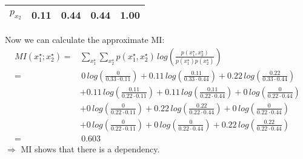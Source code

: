 {\begin{enumerate}[a)]
\begin{table}[H]
\begin{tabular}{r|rrr|r}
  		\hline 
  		$p_{x_2}$& 0.11 & 0.44 & 0.44 & 1.00 \\ 
  		\hline
  	\end{tabular}
  \end{table}
Now we can calculate the approximate MI: 
   \begin{align*}
   	MI(x_1^\star ; x_2^\star) = & \sum_{x_1^\star} \sum_{x_2^\star} p(x_1^\star, x_2^\star) \, log\left(\frac{p(x_1^\star, x_2^\star)}{p(x_1^\star) p(x_2^\star)} \right)\\
 	=& \,0\, log\left(\frac{0}{0.33 \cdot 0.11} \right) 
   	+ 0.11\, log\left(\frac{0.11}{0.33 \cdot 0.44} \right) 
   	+ 0.22\, log\left(\frac{0.22}{0.33 \cdot 0.44} \right) \\
   	&+ 0.11\, log\left(\frac{0.11}{0.22 \cdot 0.11} \right)
   	+ 0.11\, log\left(\frac{0.11}{0.22 \cdot 0.44} \right) 
   	+ 0\, log\left(\frac{0}{0.22 \cdot 0.44} \right) \\
   	&+ 0\, log\left(\frac{0}{0.22 \cdot 0.11} \right)
   	+ 0.22\, log\left(\frac{0.22}{0.22 \cdot 0.44} \right) 
   	+ 0\, log\left(\frac{0}{0.22 \cdot 0.44} \right) \\
   	&+ 0\, log\left(\frac{0}{0.22 \cdot 0.11} \right)
   	+ 0\, log\left(\frac{0}{0.22 \cdot 0.44} \right) 
   	+ 0.22\, log\left(\frac{0.22}{0.22 \cdot 0.44} \right) \\
   	= & \, 0.603
   \end{align*}
$\Rightarrow$ MI shows that there is a dependency.
  
 
  
\end{enumerate}
}
